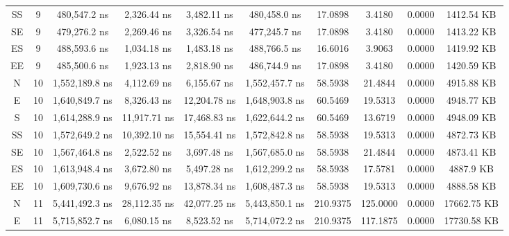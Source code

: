 \begin{sidewaystable}
\begin{tabular}{|c|c|c|c|c|c|c|c|c|c|}
        SS     & 9     & 480,547.2 ns        & 2,326.44 ns       & 3,482.11 ns         & 480,458.0 ns        & 17.0898     & 3.4180    & 0.0000    & 1412.54 KB    \\
        SE     & 9     & 479,276.2 ns        & 2,269.46 ns       & 3,326.54 ns         & 477,245.7 ns        & 17.0898     & 3.4180    & 0.0000    & 1413.22 KB    \\
        ES     & 9     & 488,593.6 ns        & 1,034.18 ns       & 1,483.18 ns         & 488,766.5 ns        & 16.6016     & 3.9063    & 0.0000    & 1419.92 KB    \\
        EE     & 9     & 485,500.6 ns        & 1,923.13 ns       & 2,818.90 ns         & 486,744.9 ns        & 17.0898     & 3.4180    & 0.0000    & 1420.59 KB    \\
        N      & 10    & 1,552,189.8 ns      & 4,112.69 ns       & 6,155.67 ns         & 1,552,457.7 ns      & 58.5938     & 21.4844   & 0.0000    & 4915.88 KB    \\
        E      & 10    & 1,640,849.7 ns      & 8,326.43 ns       & 12,204.78 ns        & 1,648,903.8 ns      & 60.5469     & 19.5313   & 0.0000    & 4948.77 KB    \\
        S      & 10    & 1,614,288.9 ns      & 11,917.71 ns      & 17,468.83 ns        & 1,622,644.2 ns      & 60.5469     & 13.6719   & 0.0000    & 4948.09 KB    \\
        SS     & 10    & 1,572,649.2 ns      & 10,392.10 ns      & 15,554.41 ns        & 1,572,842.8 ns      & 58.5938     & 19.5313   & 0.0000    & 4872.73 KB    \\
        SE     & 10    & 1,567,464.8 ns      & 2,522.52 ns       & 3,697.48 ns         & 1,567,685.0 ns      & 58.5938     & 21.4844   & 0.0000    & 4873.41 KB    \\
        ES     & 10    & 1,613,948.4 ns      & 3,672.80 ns       & 5,497.28 ns         & 1,612,299.2 ns      & 58.5938     & 17.5781   & 0.0000    & 4887.9 KB     \\
        EE     & 10    & 1,609,730.6 ns      & 9,676.92 ns       & 13,878.34 ns        & 1,608,487.3 ns      & 58.5938     & 19.5313   & 0.0000    & 4888.58 KB    \\
        N      & 11    & 5,441,492.3 ns      & 28,112.35 ns      & 42,077.25 ns        & 5,443,850.1 ns      & 210.9375    & 125.0000  & 0.0000    & 17662.75 KB   \\
        E      & 11    & 5,715,852.7 ns      & 6,080.15 ns       & 8,523.52 ns         & 5,714,072.2 ns      & 210.9375    & 117.1875  & 0.0000    & 17730.58 KB   \\

\end{tabular}
\end{sidewaystable}
